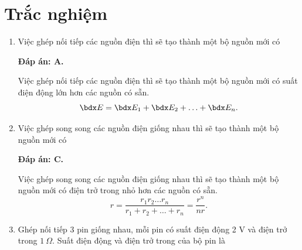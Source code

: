 \whiteBGstarBegin
\setcounter{section}{0}
\section{Trắc nghiệm}
\begin{enumerate}[label=\bfseries Câu \arabic*:]
	
	
	\item {}
	
	\cauhoi
	{Việc ghép nối tiếp các nguồn điện thì sẽ tạo thành một bộ nguồn mới có
		
	}
	\loigiai
	{	\textbf{Đáp án: A.}
		
		Việc ghép nối tiếp các nguồn điện thì sẽ tạo thành một bộ nguồn mới có suất điện động lớn hơn các nguồn có sẵn.
		$$\calE = \calE_1 + \calE_2 + \ldots + \calE_n.$$
	}
	\item {}
	
	\cauhoi
	{Việc ghép song song các nguồn điện giống nhau thì sẽ tạo thành một bộ nguồn mới có
		
	}
	\loigiai
	{	\textbf{Đáp án: C.}
		
		Việc ghép song song các nguồn điện giống nhau thì sẽ tạo thành một bộ nguồn mới có điện trở trong nhỏ hơn các nguồn có sẵn.
		$$r=\dfrac{r_1 r_2 \ldots r_n}{r_1 + r_2 + \ldots + r_n} = \dfrac{r^n}{nr}.$$
	}
	\item {}
	
	\cauhoi
	{Ghép nối tiếp 3 pin giống nhau, mỗi pin có suất điện động 2 V và điện trở trong $\SI{1}{\Omega}$. Suất điện động và điện trở trong của bộ pin là
		
}
\end{enumerate}
